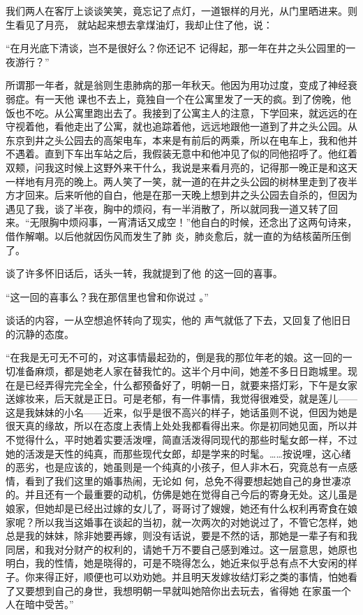 \documentclass{article}
\begin{document}
我们两人在客厅上谈谈笑笑，竟忘记了点灯，一道银样的月光，从门里晒进来。则生看见了月亮，
就站起来想去拿煤油灯，我却止住了他，说： 

“在月光底下清谈，岂不是很好么？你还记不
记得起，那一年在井之头公园里的一夜游行？” 

所谓那一年者，就是翁则生患肺病的那一年秋天。他因为用功过度，变成了神经衰弱症。有一天他
\newpage
课也不去上，竟独自一个在公寓里发了一天的疯。到了傍晚，他饭也不吃。从公寓里跑出去了。我接到了公寓主人的注意，下学回来，就远远的在守视着他，看他走出了公寓，就也追踪着他，远远地跟他一道到了井之头公园。从东京到井之头公园去的高架电车，本来是有前后的两乘，所以在电车上，我和他并不遇着。直到下车出车站之后，我假装无意中和他冲见了似的同他招呼了。他红着双颊，问我这时候上这野外来干什么，我说是来看月亮的，记得那一晚正是和这天一样地有月亮的晚上。两人笑了一笑，就一道的在井之头公园的树林里走到了夜半方才回来。后来听他的自白，他是在那一天晚上想到井之头公园去自杀的，但因为遇见了我，谈了半夜，胸中的烦闷，有一半消散了，所以就同我一道又转了回来。“无限胸中烦闷事，一宵清话又成空！”他自白的时候，还念出了这两句诗来，借作解嘲。以后他就因伤风而发生了肺
炎，肺炎愈后，就一直的为结核菌所压倒了。 

谈了许多怀旧话后，话头一转，我就提到了他
的这一回的喜事。 

\newpage

“这一回的喜事么？我在那信里也曾和你说过
。” 

谈话的内容，一从空想追怀转向了现实，他的
声气就低了下去，又回复了他旧日的沉静的态度。 

“在我是无可无不可的，对这事情最起劲的，倒是我的那位年老的娘。这一回的一切准备麻烦，都是她老人家在替我忙的。这半个月中间，她差不多日日跑城里。现在是已经弄得完完全全，什么都预备好了，明朝一日，就要来搭灯彩，下午是女家送嫁妆来，后天就是正日。可是老郁，有一件事情，我觉得很难受，就是莲儿——这是我妹妹的小名——近来，似乎是很不高兴的样子，她话虽则不说，但因为她是很天真的缘故，所以在态度上表情上处处我都看得出来。你是初同她见面，所以并不觉得什么，平时她着实要活泼哩，简直活泼得同现代的那些时髦女郎一样，不过她的活泼是天性的纯真，而那些现代女郎，却是学来的时髦。……按说哩，这心绪的恶劣，也是应该的，她虽则是一个纯真的小孩子，但人非木石，究竟总有一点感情，看到了我们这里的婚事热闹，无论如
\newpage
何，总免不得要想起她自己的身世凄凉的。并且还有一个最重要的动机，仿佛是她在觉得自己今后的寄身无处。这儿虽是娘家，但她却是已经出过嫁的女儿了，哥哥讨了嫂嫂，她还有什么权利再寄食在娘家呢？所以我当这婚事在谈起的当初，就一次两次的对她说过了，不管它怎样，她总是我的妹妹，除非她要再嫁，则没有话说，要是不然的话，那她是一辈子有和我同居，和我对分财产的权利的，请她千万不要自己感到难过。这一层意思，她原也明白，我的性情，她是晓得的，可是不晓得怎么，她近来似乎总有点不大安闲的样子。你来得正好，顺便也可以劝劝她。并且明天发嫁妆结灯彩之类的事情，怕她看了又要想到自己的身世，我想明朝一早就叫她陪你出去玩去，省得她
在家虽一个人在暗中受苦。” 
\end{document}
